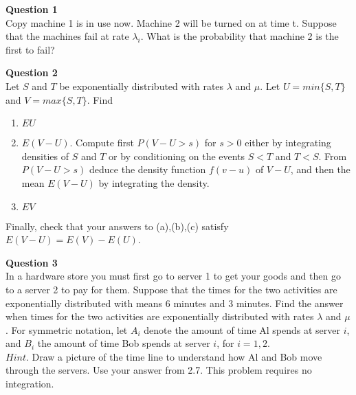 \documentclass[12pt]{article}
\begin{document}


\noindent
\textbf{Question 1}\\
Copy machine 1 is in use now. Machine 2 will be turned on at time t.
Suppose that the machines fail at rate $\lambda_i$. What is the probability that machine 2 is the first to fail?

\vspace{1.5\baselineskip}

\textbf{Question 2}\\
Let $S$ and $T$ be exponentially distributed with rates $\lambda$ and $\mu$. Let $U= min\{S,T\}$ and $V=max\{S,T\}$. Find
\begin{enumerate}[label=(\alph*)]
    \item $EU$
    \item $E(V-U)$. Compute first $P(V-U > s)$ for $s>0$ either by integrating densities of $S$ and $T$ or by conditioning on the events $S<T$ and $T<S$. From $P(V-U>s)$ deduce the density function $f(v-u)$ of $V-U$, and then the mean $E(V-U)$ by integrating the density.
    \item $EV$
\end{enumerate}
Finally, check that your answers to (a),(b),(c) satisfy $E(V-U) = E(V)-E(U)$.


\vspace{1.5\baselineskip}
\textbf{Question 3}\\
In a hardware store you must first go to server 1 to get your goods and then go to a server 2 to pay for them. Suppose that the times for the two activities are exponentially distributed with means 6 minutes and 3 minutes. Find the answer when times for the two activities are exponentially distributed with rates $\lambda$ and $\mu$. For symmetric notation, let $A_i$ denote the amount of time Al spends at server $i$, and $B_i$ the amount of time Bob spends at server $i$, for $i=1,2$.\\
$Hint$. Draw a picture of the time line to understand how Al and Bob move through the servers. Use your answer from 2.7. This problem requires no integration.
\end{document}
